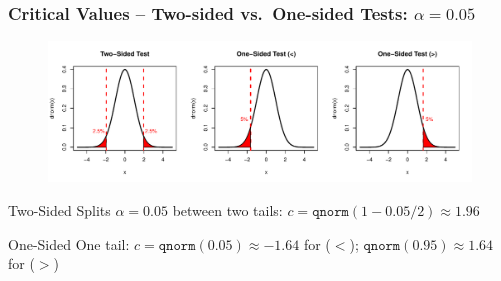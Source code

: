 \begin{frame}
  \frametitle{Critical Values -- Two-sided vs.\ One-sided Tests: $\alpha = 0.05$}

  \small

  \vspace{-1em}

  \begin{figure}
    \centering
    \includegraphics[scale=0.5]{./images/onesided_vs_twosided.pdf}
  \end{figure}

  \vspace{-2em}

  \begin{block}{Two-Sided}
    Splits $\alpha=0.05$ between two tails: $c = \texttt{qnorm}(1 - 0.05/2) \approx 1.96$ 
  \end{block}

  \begin{block}{One-Sided}
    One tail: $c = \texttt{qnorm}(0.05)\approx  -1.64$ for ($<$); $\texttt{qnorm}(0.95) \approx 1.64$ for ($>$) 
  \end{block}
\end{frame}
